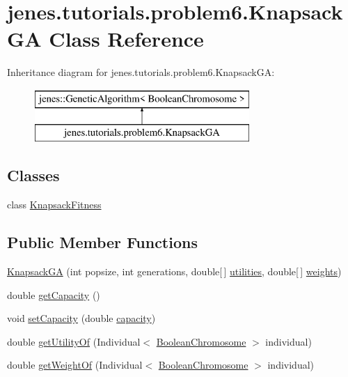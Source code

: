 \hypertarget{classjenes_1_1tutorials_1_1problem6_1_1_knapsack_g_a}{\section{jenes.\-tutorials.\-problem6.\-Knapsack\-G\-A Class Reference}
\label{classjenes_1_1tutorials_1_1problem6_1_1_knapsack_g_a}
}
Inheritance diagram for jenes.\-tutorials.\-problem6.\-Knapsack\-G\-A\-:\begin{figure}[H]
\begin{center}
\leavevmode
\includegraphics[height=2.000000cm]{classjenes_1_1tutorials_1_1problem6_1_1_knapsack_g_a}
\end{center}
\end{figure}
\subsection*{Classes}
\begin{DoxyCompactItemize}
\item 
class \hyperlink{classjenes_1_1tutorials_1_1problem6_1_1_knapsack_g_a_1_1_knapsack_fitness}{Knapsack\-Fitness}
\end{DoxyCompactItemize}
\subsection*{Public Member Functions}
\begin{DoxyCompactItemize}
\item 
\hyperlink{classjenes_1_1tutorials_1_1problem6_1_1_knapsack_g_a_aa9c826f237b43aa1cd061664c2f81f42}{Knapsack\-G\-A} (int popsize, int generations, double\mbox{[}$\,$\mbox{]} \hyperlink{classjenes_1_1tutorials_1_1problem6_1_1_knapsack_g_a_ae651e8e0a6b9bdd61515da9f2689f3f5}{utilities}, double\mbox{[}$\,$\mbox{]} \hyperlink{classjenes_1_1tutorials_1_1problem6_1_1_knapsack_g_a_afe0b0b55dd92cf81368115a9385aae05}{weights})
\item 
double \hyperlink{classjenes_1_1tutorials_1_1problem6_1_1_knapsack_g_a_aa8e92fd2de8e1168d812074c0ebd19d1}{get\-Capacity} ()
\item 
void \hyperlink{classjenes_1_1tutorials_1_1problem6_1_1_knapsack_g_a_a6fd3b4ce9620189f4ef916a3616d7868}{set\-Capacity} (double \hyperlink{classjenes_1_1tutorials_1_1problem6_1_1_knapsack_g_a_ab169e26ab1954615b1469cfada76bd52}{capacity})
\item 
double \hyperlink{classjenes_1_1tutorials_1_1problem6_1_1_knapsack_g_a_a77be24cd9e25a9306562826f56113641}{get\-Utility\-Of} (Individual$<$ \hyperlink{classjenes_1_1chromosome_1_1_boolean_chromosome}{Boolean\-Chromosome} $>$ individual)
\item 
double \hyperlink{classjenes_1_1tutorials_1_1problem6_1_1_knapsack_g_a_ab3cf2a428b860020788cfbe381ed195f}{get\-Weight\-Of} (Individual$<$ \hyperlink{classjenes_1_1chromosome_1_1_boolean_chromosome}{Boolean\-Chromosome} $>$ individual)
\end{DoxyCompactItemize}
